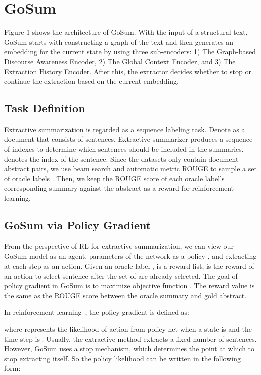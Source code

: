 \documentclass[11pt,a4paper]{article}
\begin{document}
\section{GoSum }
\label{sec:method}

Figure 1 shows the architecture of GoSum. With the input of a structural text,  GoSum starts with constructing a  graph of the text
and then generates  an embedding for the current state by using three sub-encoders: 1) The Graph-based Discourse Awareness Encoder, 2) The Global Context Encoder, and 3) The Extraction History Encoder. After this, the extractor decides whether to stop or continue the extraction based on the current embedding. 


\subsection{Task Definition}
Extractive summarization is regarded as a sequence labeling task.
Denote  as a document that consists of  sentences. Extractive summarizer produces a sequence of indexes  to determine which sentences should be included in the summaries.
 denotes the index of the sentence.
Since the datasets only contain document-abstract pairs, we use beam search and automatic metric ROUGE to sample a set of oracle labels .
Then, we keep the ROUGE score of each oracle label's corresponding summary against the abstract as a reward for reinforcement learning.

\subsection{GoSum via Policy Gradient}
From the perspective of RL for extractive summarization, we can view our GoSum model  as an agent, parameters of the network as a policy , and  extracting at each step  as an action.
Given an oracle label ,  is a reward list,  is the reward of an action to select sentence  after the set of  are already selected.
The goal of policy gradient in GoSum is to maximize objective function .
The reward value  is the same as the ROUGE \cite{rouge_2004} score  between the oracle summary and gold abstract.


In reinforcement learning~\cite{rl_1992}, the policy gradient is defined as:



where  represents the likelihood of action  from policy net  when a state is  and the time step is .
Usually, the extractive method extracts a fixed number of sentences. However, GoSum uses a stop mechanism, which  determines the point at which to stop extracting itself. So the policy likelihood can be written in the following form:
\end{document}
